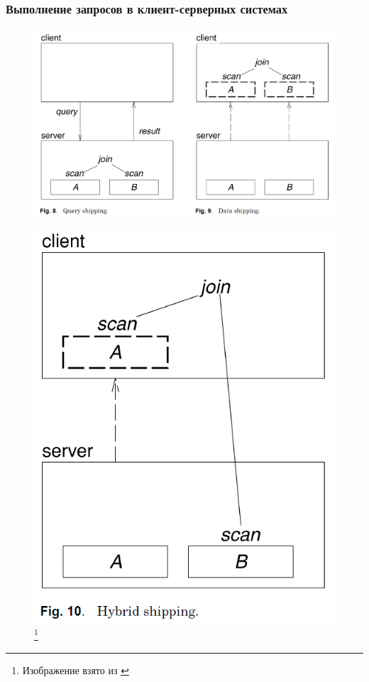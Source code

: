 \documentclass{beamer}
\begin{document}
\begin{frame}
\frametitle{Выполнение запросов в клиент-серверных системах}

\begin{multicols}{2}

\begin{figure}[htb]
\includegraphics[width=\textwidth,height=0.35\textheight,keepaspectratio]{kossman-7.png} 
 \end{figure} 
	\columnbreak
   
\begin{figure}[htb]
	\includegraphics[width=\textwidth,height=0.35\textheight,keepaspectratio]{kossman-7a.png} 
	\footnote{\tiny{Изображение взято из \cite{Kossmann2000}}}
\end{figure}    
\end{multicols}


\end{frame}
\end{document}
